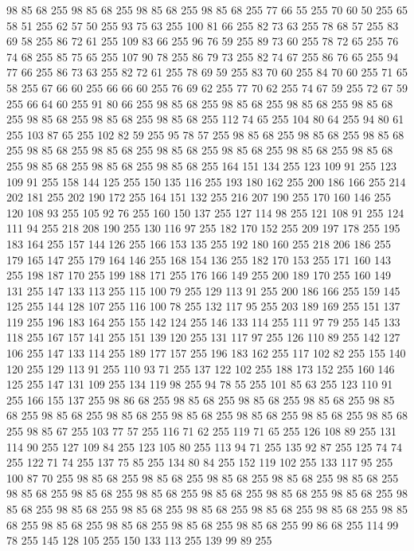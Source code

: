 98 85 68 255 98 85 68 255 98 85 68 255 98 85 68 255 77 66 55 255 70 60 50 255 65 58 51 255 62 57 50 255 93 75 63 255 100 81 66 255 82 73 63 255 78 68 57 255 83 69 58 255 86 72 61 255 109 83 66 255 96 76 59 255 89 73 60 255 78 72 65 255 76 74 68 255 85 75 65 255 107 90 78 255 86 79 73 255 82 74 67 255 86 76 65 255 94 77 66 255 86 73 63 255 82 72 61 255 78 69 59 255 83 70 60 255 84 70 60 255 71 65 58 255 67 66 60 255 66 66 60 255 76 69 62 255 77 70 62 255 74 67 59 255 72 67 59 255 66 64 60 255 91 80 66 255 98 85 68 255 98 85 68 255 98 85 68 255 98 85 68 255 98 85 68 255 98 85 68 255 98 85 68 255 112 74 65 255 104 80 64 255 94 80 61 255 103 87 65 255 102 82 59 255 95 78 57 255 98 85 68 255 98 85 68 255 98 85 68 255 98 85 68 255 98 85 68 255 98 85 68 255 98 85 68 255 98 85 68 255 98 85 68 255 98 85 68 255 98 85 68 255 98 85 68 255
164 151 134 255 123 109 91 255 123 109 91 255 158 144 125 255 150 135 116 255 193 180 162 255 200 186 166 255 214 202 181 255 202 190 172 255 164 151 132 255 216 207 190 255 170 160 146 255 120 108 93 255 105 92 76 255 160 150 137 255 127 114 98 255 121 108 91 255 124 111 94 255 218 208 190 255 130 116 97 255 182 170 152 255 209 197 178 255 195 183 164 255 157 144 126 255 166 153 135 255 192 180 160 255 218 206 186 255 179 165 147 255 179 164 146 255 168 154 136 255 182 170 153 255 171 160 143 255 198 187 170 255 199 188 171 255 176 166 149 255 200 189 170 255 160 149 131 255 147 133 113 255 115 100 79 255 129 113 91 255 200 186 166 255 159 145 125 255 144 128 107 255 116 100 78 255 132 117 95 255 203 189 169 255 151 137 119 255 196 183 164 255 155 142 124 255 146 133 114 255 111 97 79 255 145 133 118 255 167 157 141 255 151 139 120 255 131 117 97 255 126 110 89 255 142 127 106 255 147 133 114 255 189 177 157 255 196 183 162 255 117 102 82 255 155 140 120 255 129 113 91 255 110 93 71 255
137 122 102 255 188 173 152 255 160 146 125 255 147 131 109 255 134 119 98 255 94 78 55 255 101 85 63 255 123 110 91 255 166 155 137 255 98 86 68 255 98 85 68 255 98 85 68 255 98 85 68 255 98 85 68 255 98 85 68 255 98 85 68 255 98 85 68 255 98 85 68 255 98 85 68 255 98 85 68 255 98 85 67 255 103 77 57 255 116 71 62 255 119 71 65 255 126 108 89 255 131 114 90 255 127 109 84 255 123 105 80 255 113 94 71 255 135 92 87 255 125 74 74 255 122 71 74 255 137 75 85 255 134 80 84 255 152 119 102 255 133 117 95 255 100 87 70 255 98 85 68 255 98 85 68 255 98 85 68 255 98 85 68 255 98 85 68 255 98 85 68 255 98 85 68 255 98 85 68 255 98 85 68 255 98 85 68 255 98 85 68 255 98 85 68 255 98 85 68 255 98 85 68 255 98 85 68 255 98 85 68 255 98 85 68 255 98 85 68 255 98 85 68 255 98 85 68 255 98 85 68 255 98 85 68 255 99 86 68 255 114 99 78 255 145 128 105 255 150 133 113 255 139 99 89 255
